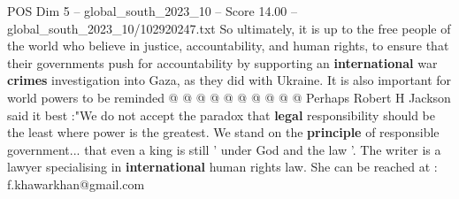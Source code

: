 \begin{textsample}{POS Dim 5 – global\_south\_2023\_10 – Score 14.00 – global\_south\_2023\_10/102920247.txt}
So ultimately, it is up to the free people of the world who believe in justice, accountability, and human rights, to ensure that their governments push for accountability by supporting an \textbf{international} war \textbf{crimes} investigation into Gaza, as they did with Ukraine.
It is also important for world powers to be reminded @ @ @ @ @ @ @ @ @ @ Perhaps Robert H Jackson said it best :"We do not accept the paradox that \textbf{legal} responsibility should be the least where power is the greatest.
We stand on the \textbf{principle} of responsible government... that even a king is still ' under God and the law '.
The writer is a lawyer specialising in \textbf{international} human rights law.
She can be reached at : f.khawarkhan@gmail.com

\end{textsample}
